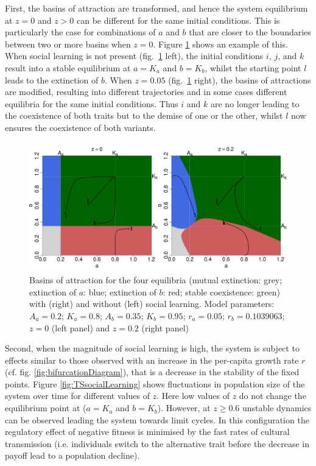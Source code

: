 \documentclass[review,authoryear]{elsarticle}
\begin{document}
First, the basins of attraction are transformed, and hence the system equilibrium at $z=0$ and $z>0$ can be different for the same initial conditions. This is particularly the case for combinations of $a$ and $b$ that are closer to the boundaries between two or more basins when $z=0$.  Figure \ref{fig:TransmissionBasin} shows an example of this. When social learning is not present (fig.~\ref{fig:TransmissionBasin} left), the initial conditions $i$, $j$, and $k$ result into a stable equilibrium at $a=K_a$ and $b=K_b$, whilst the starting point $l$ leads to the extinction of $b$. When $z=0.05$ (fig.~\ref{fig:TransmissionBasin} right), the basins of attractions are modified, resulting into different trajectories and in some cases different equilibria for the same initial conditions. Thus $i$ and $k$ are no longer leading to the coexistence of both traits but to the demise of one or the other, whilst $l$ now ensures the coexistence of both variants. 

\begin{figure}
  \centering
      \includegraphics[width=\columnwidth]{./figures/figure3.pdf}
  \caption{Basins of attraction for the four equilibria (mutual extinction: grey; extinction of $a$: blue; extinction of $b$: red; stable coexistence: green) with (right) and without (left) social learning. Model parameters: $A_a=0.2$; $K_a=0.8$; $A_b=0.35$; $K_b=0.95$; $r_a=0.05$; $r_b=0.1039063$; $z=0$ (left panel) and $z=0.2$ (right panel) } 
    \label{fig:TransmissionBasin}
\end{figure}


Second, when the magnitude of social learning is high, the system is subject to effects similar to those observed with an increase in the per-capita growth rate $r$ (cf. fig. \ref{fig:bifurcationDiagram}), that is a decrease in the stability of the fixed points. Figure \ref{fig:TSsocialLearning} shows fluctuations in population size of the system over time for different values of $z$. Here low values of $z$ do not change the equilibrium point at ($a=K_a$ and $b=K_b$). However, at $z \geq 0.6$ unstable dynamics can be observed leading the system towards limit cycles. In this configuration the regulatory effect of negative fitness is minimised by the fast rates of cultural transmission (i.e. individuals switch to the alternative trait before the decrease in payoff lead to a population decline).
\end{document}
